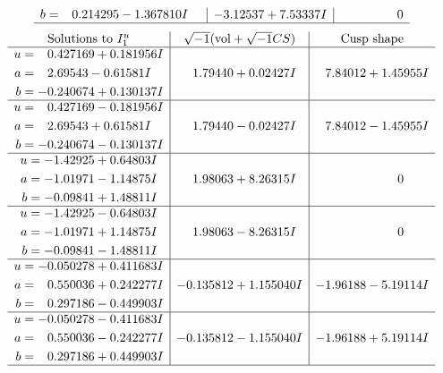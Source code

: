 \documentclass[1p]{elsarticle_modified}
\theoremstyle{definition}
\newcommand{\I}{\sqrt{-1}}
\begin{document}
$$\begin{array}{c|c|c}
\begin{aligned}
b &= \phantom{-}0.214295 - 1.367810 I\end{aligned}
 & -3.12537 + 7.53337 I & \phantom{-0.000000 } 0\\
 \hline 
 \end{array}$$\newpage$$\begin{array}{c|c|c}  
\text{Solutions to }I^u_{1}& \I (\text{vol} + \sqrt{-1}CS) & \text{Cusp shape}\\
 \hline 
\begin{aligned}
u &= \phantom{-}0.427169 + 0.181956 I \\
a &= \phantom{-}2.69543 - 0.61581 I \\
b &= -0.240674 + 0.130137 I\end{aligned}
 & \phantom{-}1.79440 + 0.02427 I & \phantom{-}7.84012 + 1.45955 I \\ \hline\begin{aligned}
u &= \phantom{-}0.427169 - 0.181956 I \\
a &= \phantom{-}2.69543 + 0.61581 I \\
b &= -0.240674 - 0.130137 I\end{aligned}
 & \phantom{-}1.79440 - 0.02427 I & \phantom{-}7.84012 - 1.45955 I \\ \hline\begin{aligned}
u &= -1.42925 + 0.64803 I \\
a &= -1.01971 - 1.14875 I \\
b &= -0.09841 + 1.48811 I\end{aligned}
 & \phantom{-}1.98063 + 8.26315 I & \phantom{-0.000000 } 0 \\ \hline\begin{aligned}
u &= -1.42925 - 0.64803 I \\
a &= -1.01971 + 1.14875 I \\
b &= -0.09841 - 1.48811 I\end{aligned}
 & \phantom{-}1.98063 - 8.26315 I & \phantom{-0.000000 } 0 \\ \hline\begin{aligned}
u &= -0.050278 + 0.411683 I \\
a &= \phantom{-}0.550036 + 0.242277 I \\
b &= \phantom{-}0.297186 - 0.449903 I\end{aligned}
 & -0.135812 + 1.155040 I & -1.96188 - 5.19114 I \\ \hline\begin{aligned}
u &= -0.050278 - 0.411683 I \\
a &= \phantom{-}0.550036 - 0.242277 I \\
b &= \phantom{-}0.297186 + 0.449903 I\end{aligned}
 & -0.135812 - 1.155040 I & -1.96188 + 5.19114 I\\
 \hline 
 \end{array}$$\newpage\newpage\renewcommand{\arraystretch}{1}
\end{document}
